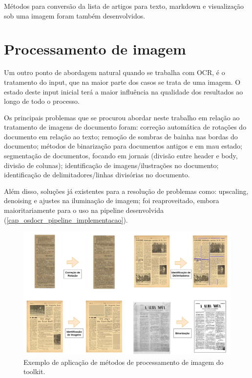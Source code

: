 Métodos para conversão da lista de artigos para texto, markdown e visualização sob uma imagem foram também desenvolvidos.



\section{Processamento de imagem}
\label{contribution_image_processing}


Um outro ponto de abordagem natural quando se trabalha com OCR, é o tratamento do input, que na maior parte dos casos se trata de uma imagem. O estado deste input inicial terá a maior influência na qualidade dos resultados ao longo de todo o processo.

Os principais problemas que se procurou abordar neste trabalho em relação ao tratamento de imagens de documento foram: correção automática de rotações do documento em relação ao texto; remoção de sombras de bainha nas bordas do documento; métodos de binarização para documentos antigos e em mau estado; segmentação de documentos, focando em jornais (divisão entre header e body, divisão de colunas); identificação de imagens/ilustrações no documento; identificação de delimitadores/linhas divisórias no documento. 

Além disso, soluções já existentes para a resolução de problemas como: upscaling, denoising e ajustes na iluminação de imagem; foi reaproveitado, embora maioritariamente para o uso na pipeline desenvolvida (\ref{cap_osdocr_pipeline_implementacao}).


\begin{figure}[H]
	\centering
	\includegraphics[width=1\textwidth]{images/ilustracoes/image_processing_examples.png}
	\caption{Exemplo de aplicação de métodos de processamento de imagem do toolkit.}
	\label{fig:image_processing_examples}
\end{figure}


